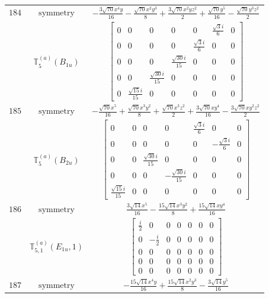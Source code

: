 \documentclass[fleqn,8pt,landscape]{jsarticle}
\begin{document}
\begin{longtable}{ccc}
$ 184 $ & $ \text{symmetry} $ & $ - \frac{3 \sqrt{70} x^{4} y}{16} - \frac{\sqrt{70} x^{2} y^{3}}{8} + \frac{3 \sqrt{70} x^{2} y z^{2}}{2} + \frac{\sqrt{70} y^{5}}{16} - \frac{\sqrt{70} y^{3} z^{2}}{2} $ \\
$  $ & $ \mathbb{T}_{5}^{(a)}(B_{1u}) $ & $ \begin{bmatrix} 0 & 0 & 0 & 0 & 0 & \frac{\sqrt{3} i}{6} & 0 \\ 0 & 0 & 0 & 0 & \frac{\sqrt{3} i}{6} & 0 & 0 \\ 0 & 0 & 0 & \frac{\sqrt{30} i}{15} & 0 & 0 & 0 \\ 0 & 0 & \frac{\sqrt{30} i}{15} & 0 & 0 & 0 & 0 \\ 0 & \frac{\sqrt{15} i}{15} & 0 & 0 & 0 & 0 & 0 \end{bmatrix} $ \\ \hline
$ 185 $ & $ \text{symmetry} $ & $ - \frac{\sqrt{70} x^{5}}{16} + \frac{\sqrt{70} x^{3} y^{2}}{8} + \frac{\sqrt{70} x^{3} z^{2}}{2} + \frac{3 \sqrt{70} x y^{4}}{16} - \frac{3 \sqrt{70} x y^{2} z^{2}}{2} $ \\
$  $ & $ \mathbb{T}_{5}^{(a)}(B_{2u}) $ & $ \begin{bmatrix} 0 & 0 & 0 & 0 & \frac{\sqrt{3} i}{6} & 0 & 0 \\ 0 & 0 & 0 & 0 & 0 & - \frac{\sqrt{3} i}{6} & 0 \\ 0 & 0 & \frac{\sqrt{30} i}{15} & 0 & 0 & 0 & 0 \\ 0 & 0 & 0 & - \frac{\sqrt{30} i}{15} & 0 & 0 & 0 \\ \frac{\sqrt{15} i}{15} & 0 & 0 & 0 & 0 & 0 & 0 \end{bmatrix} $ \\ \hline
$ 186 $ & $ \text{symmetry} $ & $ \frac{3 \sqrt{14} x^{5}}{16} - \frac{15 \sqrt{14} x^{3} y^{2}}{8} + \frac{15 \sqrt{14} x y^{4}}{16} $ \\
$  $ & $ \mathbb{T}_{5,1}^{(a)}(E_{1u},1) $ & $ \begin{bmatrix} \frac{i}{2} & 0 & 0 & 0 & 0 & 0 & 0 \\ 0 & - \frac{i}{2} & 0 & 0 & 0 & 0 & 0 \\ 0 & 0 & 0 & 0 & 0 & 0 & 0 \\ 0 & 0 & 0 & 0 & 0 & 0 & 0 \\ 0 & 0 & 0 & 0 & 0 & 0 & 0 \end{bmatrix} $ \\ \hline
$ 187 $ & $ \text{symmetry} $ & $ - \frac{15 \sqrt{14} x^{4} y}{16} + \frac{15 \sqrt{14} x^{2} y^{3}}{8} - \frac{3 \sqrt{14} y^{5}}{16} $ \\

\end{longtable}
\end{document}

